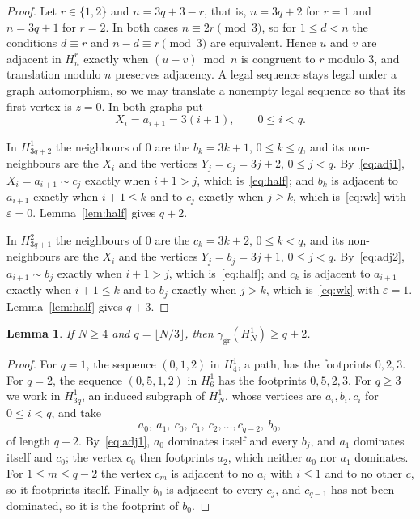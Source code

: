 \documentclass[11pt,a4paper,reqno]{amsart}
\newtheorem{lemma}[theorem]{Lemma}
\theoremstyle{definition}
\theoremstyle{remark}
\numberwithin{equation}{section}
\newcommand{\ggr}{\gamma_{\mathrm{gr}}}
\begin{document}
\begin{proof}
Let $r\in\{1,2\}$ and $n=3q+3-r$, that is, $n=3q+2$ for $r=1$ and $n=3q+1$ for $r=2$. In both cases $n\equiv 2r\pmod3$, so for $1\le d<n$ the conditions $d\equiv r$ and $n-d\equiv r\pmod3$ are equivalent. Hence $u$ and $v$ are adjacent in $H^r_n$ exactly when $(u-v)\bmod n$ is congruent to $r$ modulo $3$, and translation modulo $n$ preserves adjacency. A legal sequence stays legal under a graph automorphism, so we may translate a nonempty legal sequence so that its first vertex is $z=0$. In both graphs put
\[
 X_i=a_{i+1}=3(i+1),\qquad 0\le i<q.
\]

In $H^1_{3q+2}$ the neighbours of $0$ are the $b_k=3k+1$, $0\le k\le q$, and its non-neighbours are the $X_i$ and the vertices $Y_j=c_j=3j+2$, $0\le j<q$. By~\eqref{eq:adj1}, $X_i=a_{i+1}\sim c_j$ exactly when $i+1>j$, which is~\eqref{eq:half}; and $b_k$ is adjacent to $a_{i+1}$ exactly when $i+1\le k$ and to $c_j$ exactly when $j\ge k$, which is~\eqref{eq:wk} with $\varepsilon=0$. Lemma~\ref{lem:half} gives $q+2$.

In $H^2_{3q+1}$ the neighbours of $0$ are the $c_k=3k+2$, $0\le k<q$, and its non-neighbours are the $X_i$ and the vertices $Y_j=b_j=3j+1$, $0\le j<q$. By~\eqref{eq:adj2}, $a_{i+1}\sim b_j$ exactly when $i+1>j$, which is~\eqref{eq:half}; and $c_k$ is adjacent to $a_{i+1}$ exactly when $i+1\le k$ and to $b_j$ exactly when $j>k$, which is~\eqref{eq:wk} with $\varepsilon=1$. Lemma~\ref{lem:half} gives $q+3$.
\end{proof}

\begin{lemma}\label{lem:lower1}
If $N\ge4$ and $q=\lfloor N/3\rfloor$, then $\ggr(H^1_N)\ge q+2$.
\end{lemma}

\begin{proof}
For $q=1$, the sequence $(0,1,2)$ in $H^1_4$, a path, has the footprints $0,2,3$. For $q=2$, the sequence $(0,5,1,2)$ in $H^1_6$ has the footprints $0,5,2,3$. For $q\ge3$ we work in $H^1_{3q}$, an induced subgraph of $H^1_N$, whose vertices are $a_i,b_i,c_i$ for $0\le i<q$, and take
\[
 a_0,\ a_1,\ c_0,\ c_1,\ c_2,\dots,c_{q-2},\ b_0,
\]
of length $q+2$. By~\eqref{eq:adj1}, $a_0$ dominates itself and every $b_j$, and $a_1$ dominates itself and $c_0$; the vertex $c_0$ then footprints $a_2$, which neither $a_0$ nor $a_1$ dominates. For $1\le m\le q-2$ the vertex $c_m$ is adjacent to no $a_i$ with $i\le1$ and to no other $c$, so it footprints itself. Finally $b_0$ is adjacent to every $c_j$, and $c_{q-1}$ has not been dominated, so it is the footprint of $b_0$.
\end{proof}
\end{document}
